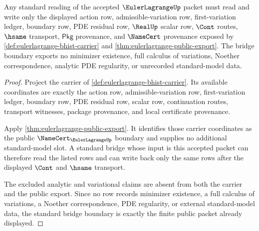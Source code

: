 \begin{theorem}
\label{thm:eulerlagrange-standard-bridge-boundary}
Any standard reading of the accepted $\EulerLagrangeUp$ packet must read and
write only the displayed action row, admissible-variation row, first-variation
ledger, boundary row, PDE residual row, $\RealUp$ scalar row, $\Cont$ routes,
$\hsame$ transport, $\mathsf{Pkg}$ provenance, and $\NameCert$ provenance
exposed by \autoref{def:eulerlagrange-bhist-carrier} and
\autoref{thm:eulerlagrange-public-export}. The bridge boundary exports no
minimizer existence, full calculus of variations, Noether correspondence,
analytic PDE regularity, or unrecorded standard-model data.
\end{theorem}
\begin{proof}
Project the carrier of \autoref{def:eulerlagrange-bhist-carrier}. Its available
coordinates are exactly the action row, admissible-variation row,
first-variation ledger, boundary row, PDE residual row, scalar row,
continuation routes, transport witnesses, package provenance, and local
certificate provenance.

Apply \autoref{thm:eulerlagrange-public-export}. It identifies those carrier
coordinates as the public $\NameCert_{\EulerLagrangeUp}$ boundary and supplies
no additional standard-model slot. A standard bridge whose input is this
accepted packet can therefore read the listed rows and can write back only the
same rows after the displayed $\Cont$ and $\hsame$ transport.

The excluded analytic and variational claims are absent from both the carrier
and the public export. Since no row records minimizer existence, a full calculus
of variations, a Noether correspondence, PDE regularity, or external
standard-model data, the standard bridge boundary is exactly the finite public
packet already displayed.
\end{proof}

